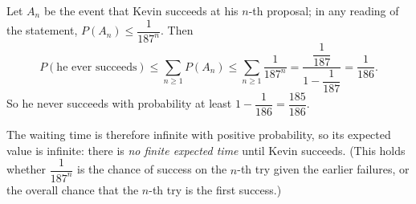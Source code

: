 Let $A_n$ be the event that Kevin succeeds at his $n$-th proposal; in any reading of the statement, $P(A_n)\le\dfrac1{187^n}$. Then
\[P(\text{he ever succeeds})\le\sum_{n\ge1}P(A_n)\le\sum_{n\ge1}\dfrac1{187^n}=\dfrac{\dfrac1{187}}{1-\dfrac1{187}}=\dfrac1{186}.\]
So he never succeeds with probability at least $1-\dfrac1{186}=\boxed{\dfrac{185}{186}}$.

The waiting time is therefore infinite with positive probability, so its expected value is infinite: there is \emph{no finite expected time} until Kevin succeeds. (This holds whether $\dfrac1{187^n}$ is the chance of success on the $n$-th try given the earlier failures, or the overall chance that the $n$-th try is the first success.)

